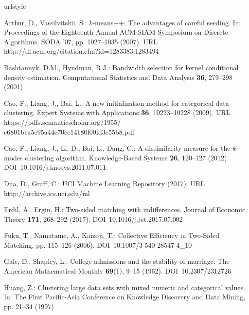 \documentclass[smallextended]{svjour3}
\begin{document}
\begin{thebibliography}{10}
\providecommand{\url}[1]{{#1}}
\providecommand{\urlprefix}{URL }
\expandafter\ifx\csname urlstyle\endcsname\relax
  \providecommand{\doi}[1]{DOI~\discretionary{}{}{}#1}\else
  \providecommand{\doi}{DOI~\discretionary{}{}{}\begingroup
  \urlstyle{rm}\Url}\fi

Arthur, D., Vassilvitskii, S.: $k$-means++: {T}he advantages of careful
  seeding.
\newblock In: Proceedings of the Eighteenth Annual ACM-SIAM Symposium on
  Discrete Algorithms, SODA '07, pp. 1027--1035 (2007).
\newblock \urlprefix\url{http://dl.acm.org/citation.cfm?id=1283383.1283494}

Bashtannyk, D.M., Hyndman, R.J.: Bandwidth selection for kernel conditional
  density estimation.
\newblock Computational Statistics and Data Analysis \textbf{36}, 279--298
  (2001)

Cao, F., Liang, J., Bai, L.: A new initialization method for categorical data
  clustering.
\newblock Expert Systems with Applications \textbf{36}, 10223--10228 (2009).
\newblock \urlprefix\url{https://pdfs.semanticscholar.org/1955/
  c6801bca5e95a44e70ce14180f00fd3e55b8.pdf}

Cao, F., Liang, J., Li, D., Bai, L., Dang, C.: A dissimilarity measure for the
  $k$-modes clustering algorithm.
\newblock Knowledge-Based Systems \textbf{26}, 120--127 (2012).
\newblock \doi{10.1016/j.knosys.2011.07.011}

Dua, D., Graff, C.: {UCI Machine Learning Repository} (2017).
\newblock \urlprefix\url{http://archive.ics.uci.edu/ml}

Erdil, A., Ergin, H.: Two-sided matching with indifferences.
\newblock Journal of Economic Theory \textbf{171}, 268--292 (2017).
\newblock \doi{10.1016/j.jet.2017.07.002}

Fuku, T., Namatame, A., Kaizoji, T.: Collective Efficiency in Two-Sided
  Matching, pp. 115--126 (2006).
\newblock \doi{10.1007/3-540-28547-4_10}

Gale, D., Shapley, L.: College admissions and the stability of marriage.
\newblock The American Mathematical Monthly \textbf{69}(1), 9--15 (1962).
\newblock \doi{10.2307/2312726}

Huang, Z.: Clustering large data sets with mixed numeric and categorical
  values.
\newblock In: The First {P}acific-{A}sia Conference on Knowledge Discovery and
  Data Mining, pp. 21--34 (1997)


\end{thebibliography}
\end{document}
